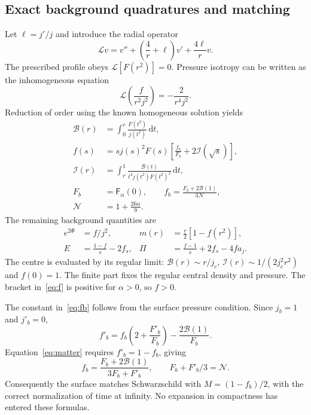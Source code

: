 \documentclass[journal,a4paper]{IEEEtran}
\newcommand{\dd}{\mathrm d}
\begin{document}
\subsection{Exact background quadratures and matching}
Let $\ell=j'/j$ and introduce the radial operator
\begin{equation}
 \mathcal L v=v''+\left(\frac4r+\ell\right)v'+\frac{4\ell}{r}v.
\end{equation}
The prescribed profile obeys $\mathcal L[F(r^2)]=0$. Pressure isotropy can be written as the inhomogeneous equation
\begin{equation}
 \mathcal L\left(\frac{f}{r^2j^2}\right)=-\frac{2}{r^4j^2}.
 \label{eq:isotropy}
\end{equation}
Reduction of order using the known homogeneous solution yields
\begin{align}
 \mathcal B(r)&=\int_0^r\frac{F(t^2)}{j(t^2)}\,\dd t,\label{eq:B}\\
 f(s)&=s j(s)^2F(s)\left[\frac{f_b}{F_b}+2\mathcal I(\sqrt s)\right],\label{eq:f}\\
 \mathcal I(r)&=\int_r^1\frac{\mathcal B(t)}{t^4j(t^2)F(t^2)^2}\,\dd t,\label{eq:integral}\\
 F_b&=\mathsf F_\alpha(0),\qquad
 f_b=\frac{F_b+2\mathcal B(1)}{3\mathcal N},\label{eq:fb}\\
 \mathcal N&=1+\frac{26\alpha}{9}.\label{eq:norm}
\end{align}
The remaining background quantities are
\begin{align}
 e^{2\Phi}&=f/j^2, &m(r)&=\frac r2[1-f(r^2)],\label{eq:background}\\
 E&=\frac{1-f}{s}-2f_s,&
 \Pi&=\frac{f-1}{s}+2f_s-4fa_j.\label{eq:matter}
\end{align}
The centre is evaluated by its regular limit: $\mathcal B(r)\sim r/j_c$, $\mathcal I(r)\sim1/(2j_c^2r^2)$ and $f(0)=1$. The finite part fixes the regular central density and pressure. The bracket in~\eqref{eq:f} is positive for $\alpha>0$, so $f>0$.

The constant in~\eqref{eq:fb} follows from the surface pressure condition. Since $j_b=1$ and $j'_b=0$,
\begin{equation}
 f'_b=f_b\left(2+\frac{F'_b}{F_b}\right)-\frac{2\mathcal B(1)}{F_b}.
\end{equation}
Equation~\eqref{eq:matter} requires $f'_b=1-f_b$, giving
\begin{equation}
 f_b=\frac{F_b+2\mathcal B(1)}{3F_b+F'_b},
 \qquad F_b+F'_b/3=\mathcal N.
\end{equation}
Consequently the surface matches Schwarzschild with $M=(1-f_b)/2$, with the correct normalization of time at infinity. No expansion in compactness has entered these formulas.
\end{document}
